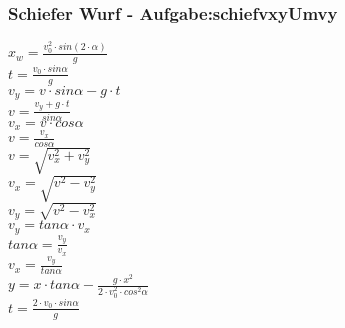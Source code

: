 \subsubsection{Schiefer Wurf  - Aufgabe:schiefvxyUmvy} 
\begin{minipage}{0.45\textwidth} 
$ x_{w}  = \frac{v_{0} ^{2} \cdot sin(2\cdot \alpha )}{       g} $\\ 
$ t =\frac{v_{0} \cdot sin \alpha }{  g} $\\ 
$ v_{y}  =  v\cdot sin\alpha - g\cdot t $\\ 
$ v= \frac{ v_{y} +g\cdot t}{ sin\alpha } $\\ 
$ v_{x}  = v\cdot  cos\alpha $\\ 
$ v= \frac{ v_{x} }{ cos\alpha } $\\ 
$ v= \sqrt{ v_{x} ^{2} + v_{y} ^{2} } $\\ 
$ v_{x} = \sqrt{ v^{2}  - v_{y} ^{2} } $\\ 
$ v_{y} = \sqrt{ v^{2}  - v_{x} ^{2} } $\\ 
$ v_{y} = tan \alpha \cdot  v_{x} $\\ 
$ tan \alpha = \frac{v_{y} }{v_{x} } $\\ 
$ v_{x} = \frac{v_{y} }{tan \alpha } $\\ 
$ y = x\cdot tan \alpha  - \frac{   g\cdot x^{2} }{2\cdot v^{2} _{0} \cdot cos ^{2}\alpha } $\\ 
$ t =\frac{2\cdot v_{0} \cdot sin \alpha }{ g} $\\ 
\end{minipage} 
\begin{minipage}{0.45\textwidth} 
 
\end{minipage} 
